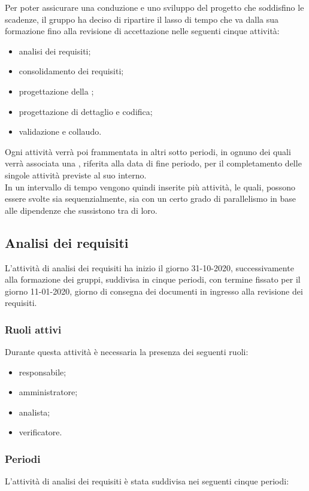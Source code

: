 Per poter assicurare una conduzione e uno sviluppo del progetto che soddisfino le scadenze, il gruppo ha deciso di ripartire il lasso di tempo che va dalla sua formazione fino alla revisione di accettazione nelle seguenti cinque attività: 

\begin{itemize} 
	\item analisi dei requisiti; 
	\item consolidamento dei requisiti; 
	\item progettazione della ; 
	\item progettazione di dettaglio e codifica; 
	\item validazione e collaudo. 
\end{itemize}	 
Ogni attività verrà poi frammentata in altri sotto periodi, in ognuno dei quali verrà associata una , 
riferita alla data di fine periodo, per il completamento delle singole attività previste al suo interno.\\ 
In un intervallo di tempo vengono quindi inserite più attività, le quali, possono essere svolte sia sequenzialmente, sia con un certo grado di parallelismo in base alle dipendenze che sussistono tra di loro. 

\subsection{Analisi dei requisiti} 
L’attività di analisi dei requisiti ha inizio il giorno 31-10-2020, successivamente alla formazione dei gruppi, suddivisa in cinque periodi, con termine fissato per il giorno 11-01-2020, giorno di consegna dei documenti in ingresso alla revisione dei requisiti. 

\subsubsection{Ruoli attivi} 
Durante questa attività è necessaria la presenza dei seguenti ruoli: 
\begin{itemize} 
	\item responsabile; 
	\item amministratore; 
	\item analista; 
	\item verificatore. 
\end{itemize} 

\subsubsection{Periodi} 
L'attività di analisi dei requisiti è stata suddivisa nei seguenti cinque periodi: 

